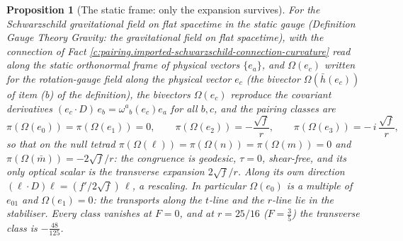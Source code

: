 \documentclass[11pt]{article}
\newtheorem{proposition}[theorem]{Proposition}
\theoremstyle{definition}
\theoremstyle{plain}
\providecommand{\hb}{}\renewcommand{\hb}{\bar{h}}
\providecommand{\mb}{}\renewcommand{\mb}{\bar m}
\providecommand{\pv}{}\renewcommand{\pv}{\pi}
\begin{document}
\begin{proposition}[The static frame: only the expansion survives]\label{c:pairing.static-frame-only-expansion-survives}
For the Schwarzschild gravitational field on flat spacetime in the static gauge (Definition \emph{Gauge Theory Gravity: the gravitational field on flat spacetime}), with the connection of Fact \ref{c:pairing.imported-schwarzschild-connection-curvature} read along the static orthonormal frame of physical vectors $\{e_a\}$, and $\Omega(e_c)$ written for the rotation-gauge field along the physical vector $e_c$ (the bivector $\Omega(\hb(e_c))$ of item (b) of the definition), the bivectors $\Omega(e_{c})$ reproduce the covariant derivatives $(e_{c} \cdot D)\, e_{b} = \omega^{a}{}_{b}(e_{c})e_{a}$ for all $b, c$, and the pairing classes are
\[
\pv(\Omega(e_{0})) = \pv(\Omega(e_{1})) = 0, \qquad \pv(\Omega(e_{2})) = -\frac{\sqrt f}{r}, \qquad \pv(\Omega(e_{3})) = -\,i\,\frac{\sqrt f}{r},
\]
so that on the null tetrad $\pv(\Omega(\ell)) = \pv(\Omega(n)) = \pv(\Omega(m)) = 0$ and $\pv(\Omega(\mb)) = -2\sqrt f/r$: the congruence is geodesic, $\tau = 0$, shear-free, and its only optical scalar is the transverse expansion $2\sqrt f/r$. Along its own direction $(\ell \cdot D)\ell = (f'/2\sqrt f)\,\ell$, a rescaling. In particular $\Omega(e_{0})$ is a multiple of $e_{01}$ and $\Omega(e_{1}) = 0$: the transports along the $t$-line and the $r$-line lie in the stabiliser. Every class vanishes at $F = 0$, and at $r = 25/16$ ($F = \tfrac35$) the transverse class is $-\tfrac{48}{125}$.
\end{proposition}
\end{document}
